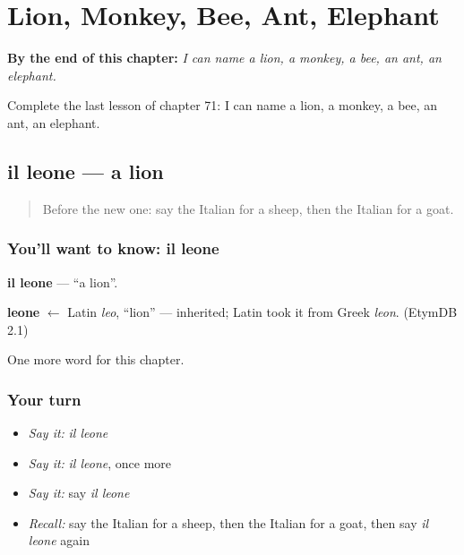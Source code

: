 
\chapter{Lion, Monkey, Bee, Ant, Elephant}
\label{ch:it-lion-monkey-bee-ant-elephant}

\begin{chapteropening}
\textbf{By the end of this chapter:} \emph{I can name a lion, a monkey, a bee, an ant, an elephant.}

Complete the last lesson of chapter 71: I can name a lion, a monkey, a bee, an ant, an elephant.
\end{chapteropening}

\section[il leone]{il leone — a lion}

\label{lesson:IT-C71-leone}



\begin{quote}
Before the new one: say the Italian for a sheep, then the Italian for a goat.
\end{quote}

\subsection*{You'll want to know: il leone}
\textbf{il leone} — \textquotedblleft{}a lion\textquotedblright{}.

\begin{cousinweb}
\textbf{leone} $\leftarrow$ Latin \emph{leo}, \textquotedblleft{}lion\textquotedblright{} — inherited; Latin took it from Greek \emph{leon}. (EtymDB 2.1)
\end{cousinweb}

\begin{grammarlens}[title={What you've built}]
One more word for this chapter.
\end{grammarlens}

\subsection*{Your turn}
\begin{itemize}
\raggedright
  \item \emph{Say it:} \emph{il leone}
  \item \emph{Say it:} \emph{il leone}, once more
  \item \emph{Say it:} say \emph{il leone}
  \item \emph{Recall:} say the Italian for a sheep, then the Italian for a goat, then say \emph{il leone} again
\end{itemize}

